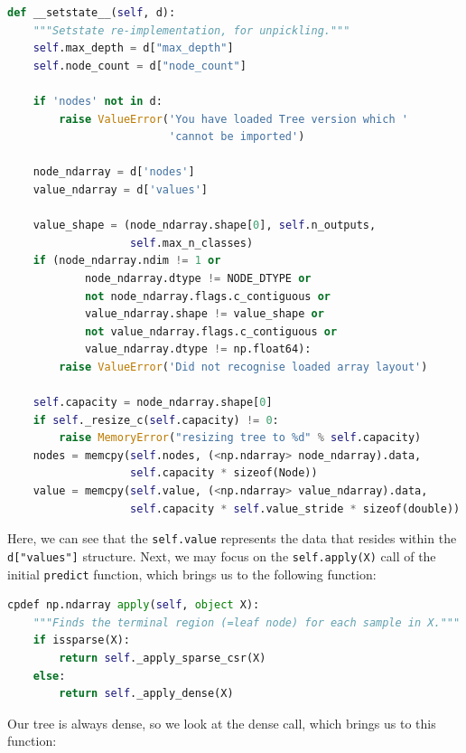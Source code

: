 \documentclass{IEEEtran}
\begin{document}
\begin{lstlisting}[language=Python]
def __setstate__(self, d):
    """Setstate re-implementation, for unpickling."""
    self.max_depth = d["max_depth"]
    self.node_count = d["node_count"]

    if 'nodes' not in d:
        raise ValueError('You have loaded Tree version which '
                         'cannot be imported')

    node_ndarray = d['nodes']
    value_ndarray = d['values']

    value_shape = (node_ndarray.shape[0], self.n_outputs,
                   self.max_n_classes)
    if (node_ndarray.ndim != 1 or
            node_ndarray.dtype != NODE_DTYPE or
            not node_ndarray.flags.c_contiguous or
            value_ndarray.shape != value_shape or
            not value_ndarray.flags.c_contiguous or
            value_ndarray.dtype != np.float64):
        raise ValueError('Did not recognise loaded array layout')

    self.capacity = node_ndarray.shape[0]
    if self._resize_c(self.capacity) != 0:
        raise MemoryError("resizing tree to %d" % self.capacity)
    nodes = memcpy(self.nodes, (<np.ndarray> node_ndarray).data,
                   self.capacity * sizeof(Node))
    value = memcpy(self.value, (<np.ndarray> value_ndarray).data,
                   self.capacity * self.value_stride * sizeof(double))
\end{lstlisting}

Here, we can see that the \verb|self.value| represents the data that resides within the \verb|d["values"]| structure. Next, we may focus on the \verb|self.apply(X)| call of the initial \verb|predict| function, which brings us to the following function:

\begin{lstlisting}[language=Python]
cpdef np.ndarray apply(self, object X):
    """Finds the terminal region (=leaf node) for each sample in X."""
    if issparse(X):
        return self._apply_sparse_csr(X)
    else:
        return self._apply_dense(X)
\end{lstlisting}

Our tree is always dense, so we look at the dense call, which brings us to this function:
\end{document}
